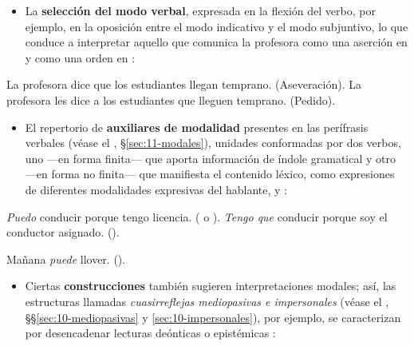 \begin{itemize}
  \item La \textbf{selección del modo verbal}, expresada en la flexión del verbo,
        por ejemplo, en la oposición entre el modo indicativo y el modo
        subjuntivo, lo que conduce a interpretar aquello que comunica la
        profesora como una aserción en  y como una orden
        en :
\end{itemize}

\begin{exe}
  \ex\label{ex:14-profesora1} La profesora dice que los estudiantes llegan
      temprano. (Aseveración).
  \ex\label{ex:14-profesora2} La profesora les dice a los estudiantes que lleguen
      temprano. (Pedido).
\end{exe}

\begin{itemize}
  \item El repertorio de \textbf{auxiliares de modalidad} presentes en las
        perífrasis verbales (véase el , §\ref{sec:11-modales}),
        unidades conformadas por dos verbos, uno ---en forma finita--- que
        aporta información de índole gramatical y otro ---en forma no finita---
        que manifiesta el contenido léxico, como expresiones de diferentes
        modalidades expresivas del hablante,  y
        :
\end{itemize}

\begin{exe}
  \ex\label{ex:14-conducir}
    \begin{xlist}
      \ex \textit{Puedo} conducir porque tengo licencia. ( o
          ).
      \ex \textit{Tengo que} conducir porque soy el conductor asignado.
          ().
    \end{xlist}
  \ex\label{ex:14-llover} Mañana \textit{puede} llover. ().
\end{exe}

\begin{itemize}
  \item Ciertas \textbf{construcciones} también sugieren interpretaciones
        modales; así, las estructuras llamadas \textit{cuasirreflejas
        mediopasivas e impersonales} (véase el ,
        §§\ref{sec:10-mediopasivas} y \ref{sec:10-impersonales}), por ejemplo,
        se caracterizan por desencadenar lecturas deónticas
         o epistémicas :
\end{itemize}

